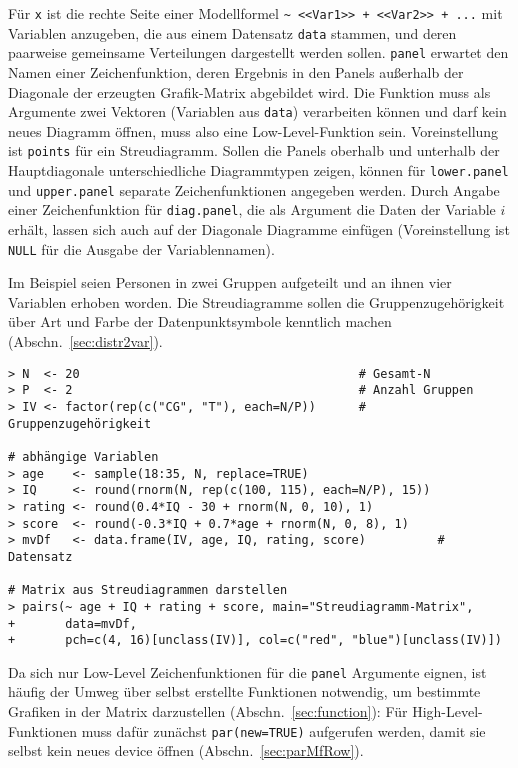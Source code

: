 Für \lstinline!x! ist die rechte Seite einer Modellformel \lstinline!~ <<Var1>> + <<Var2>> + ...! mit Variablen anzugeben, die aus einem Datensatz \lstinline!data! stammen, und deren paarweise gemeinsame Verteilungen dargestellt werden sollen. \lstinline!panel! erwartet den Namen einer Zeichenfunktion, deren Ergebnis in den Panels außerhalb der Diagonale der erzeugten Grafik-Matrix abgebildet wird. Die Funktion muss als Argumente zwei Vektoren (Variablen aus \lstinline!data!) verarbeiten können und darf kein neues Diagramm öffnen, muss also eine Low-Level-Funktion sein. Voreinstellung ist \lstinline!points! für ein Streudiagramm. Sollen die Panels oberhalb und unterhalb der Hauptdiagonale unterschiedliche Diagrammtypen zeigen, können für \lstinline!lower.panel! und \lstinline!upper.panel! separate Zeichenfunktionen angegeben werden. Durch Angabe einer Zeichenfunktion für \lstinline!diag.panel!, die als Argument die Daten der Variable $i$ erhält, lassen sich auch auf der Diagonale Diagramme einfügen (Voreinstellung ist \lstinline!NULL! für die Ausgabe der Variablennamen).

Im Beispiel seien Personen in zwei Gruppen aufgeteilt und an ihnen vier Variablen erhoben worden. Die Streudiagramme sollen die Gruppenzugehörigkeit über Art und Farbe der Datenpunktsymbole kenntlich machen (Abschn.\ \ref{sec:distr2var}).
\begin{lstlisting}
> N  <- 20                                       # Gesamt-N
> P  <- 2                                        # Anzahl Gruppen
> IV <- factor(rep(c("CG", "T"), each=N/P))      # Gruppenzugehörigkeit

# abhängige Variablen
> age    <- sample(18:35, N, replace=TRUE)
> IQ     <- round(rnorm(N, rep(c(100, 115), each=N/P), 15))
> rating <- round(0.4*IQ - 30 + rnorm(N, 0, 10), 1)
> score  <- round(-0.3*IQ + 0.7*age + rnorm(N, 0, 8), 1)
> mvDf   <- data.frame(IV, age, IQ, rating, score)          # Datensatz

# Matrix aus Streudiagrammen darstellen
> pairs(~ age + IQ + rating + score, main="Streudiagramm-Matrix",
+       data=mvDf,
+       pch=c(4, 16)[unclass(IV)], col=c("red", "blue")[unclass(IV)])
\end{lstlisting}

Da sich nur Low-Level Zeichenfunktionen für die \lstinline!panel! Argumente eignen, ist häufig der Umweg über selbst erstellte Funktionen notwendig, um bestimmte Grafiken in der Matrix darzustellen (Abschn.\ \ref{sec:function}): Für High-Level-Funktionen muss dafür zunächst \lstinline!par(new=TRUE)! aufgerufen werden, damit sie selbst kein neues device öffnen (Abschn.\ \ref{sec:parMfRow}).

